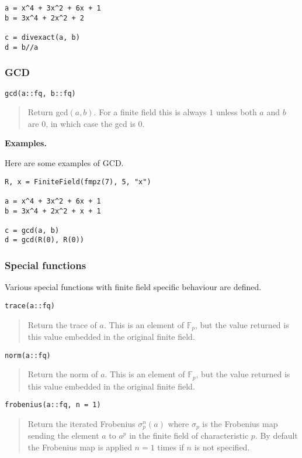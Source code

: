 \documentclass[a4paper,10pt]{article}
\newcommand{\F}{\mathbb{F}}
\newcommand{\desc}[1]{\vspace{-3mm}\begin{quote}#1\end{quote}}
\begin{document}
{{\begin{lstlisting}
a = x^4 + 3x^2 + 6x + 1
b = 3x^4 + 2x^2 + 2

c = divexact(a, b)
d = b//a
\end{lstlisting}

\subsubsection{GCD}

\begin{lstlisting}
gcd(a::fq, b::fq)
\end{lstlisting}

\desc{Return gcd$(a, b)$. For a finite field this is always $1$ unless both
$a$ and $b$ are $0$, in which case the gcd is $0$.}

\textbf{Examples.}

Here are some examples of GCD.

\begin{lstlisting}
R, x = FiniteField(fmpz(7), 5, "x")

a = x^4 + 3x^2 + 6x + 1
b = 3x^4 + 2x^2 + x + 1

c = gcd(a, b)
d = gcd(R(0), R(0))
\end{lstlisting}

\subsubsection{Special functions}

Various special functions with finite field specific behaviour are
defined.

\begin{lstlisting}
trace(a::fq)
\end{lstlisting}

\desc{Return the trace of $a$. This is an element of $\F_p$, but the value
returned is this value embedded in the original finite field.}

\begin{lstlisting}
norm(a::fq)
\end{lstlisting}

\desc{Return the norm of $a$. This is an element of $\F_p$, but the value
returned is this value embedded in the original finite field.}

\begin{lstlisting}
frobenius(a::fq, n = 1)
\end{lstlisting}

\desc{Return the iterated Frobenius $\sigma_p^n(a)$ where $\sigma_p$ is the 
Frobenius map sending the element $a$ to $a^p$ in the finite field of 
characteristic $p$. By default the Frobenius map is applied $n = 1$ times if
$n$ is not specified.}

}}
\end{document}
